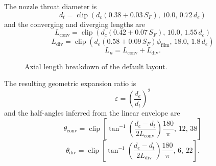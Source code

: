 \documentclass[11pt]{article}
\newcommand{\clip}{\operatorname{clip}}
\begin{document}
The nozzle throat diameter is
\begin{equation}
d_t
=
\clip\!\left(
d_c\left(0.38+0.03\,S_F\right),\,
10.0,\,
0.72\,d_e
\right)
\label{eq:throat-diameter}
\end{equation}
and the converging and diverging lengths are
\begin{equation}
L_{\text{conv}}
=
\clip\!\left(
d_c\left(0.42+0.07\,S_F\right),\,
10.0,\,
1.55\,d_c
\right)
\label{eq:lconv}
\end{equation}
\begin{equation}
L_{\text{div}}
=
\clip\!\left(
d_e\left(0.58+0.09\,S_F\right)\phi_{\text{film}},\,
18.0,\,
1.8\,d_e
\right)
\label{eq:ldiv}
\end{equation}
\begin{equation}
L_n = L_{\text{conv}} + L_{\text{div}}.
\label{eq:nozzle-length}
\end{equation}

\begin{figure}[H]
\centering
{}
\caption{Axial length breakdown of the default layout.}
\end{figure}

The resulting geometric expansion ratio is
\begin{equation}
\varepsilon = \left(\frac{d_e}{d_t}\right)^2
\label{eq:expansion-ratio}
\end{equation}
and the half-angles inferred from the linear envelope are
\begin{equation}
\theta_{\text{conv}}
=
\clip\!\left[
\tan^{-1}\!\left(
\frac{d_c-d_t}{2L_{\text{conv}}}
\right)\frac{180}{\pi},
\,
12,\,
38
\right]
\label{eq:conv-angle}
\end{equation}
\begin{equation}
\theta_{\text{div}}
=
\clip\!\left[
\tan^{-1}\!\left(
\frac{d_e-d_t}{2L_{\text{div}}}
\right)\frac{180}{\pi},
\,
6,\,
22
\right].
\label{eq:div-angle}
\end{equation}
\end{document}
